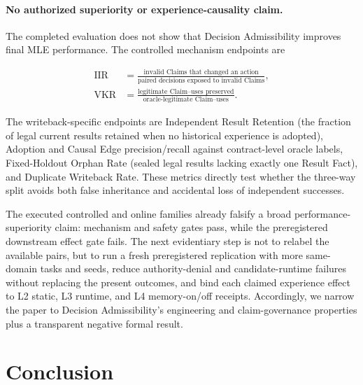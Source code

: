 \documentclass{article}
\begin{document}
\paragraph{No authorized superiority or experience-causality claim.}
The completed evaluation does not show that Decision Admissibility improves
final MLE performance.  The controlled mechanism endpoints are

\begin{equation*}
\begin{aligned}
\mathrm{IIR}&=\frac{\text{invalid Claims that changed an action}}
{\text{paired decisions exposed to invalid Claims}},\\
\mathrm{VKR}&=\frac{\text{legitimate Claim--uses preserved}}
{\text{oracle-legitimate Claim--uses}}.
\end{aligned}
\end{equation*}

The writeback-specific endpoints are Independent Result Retention (the fraction
of legal current results retained when no historical experience is adopted),
Adoption and Causal Edge precision/recall against contract-level oracle labels,
Fixed-Holdout Orphan Rate (sealed legal results lacking exactly one Result
Fact), and Duplicate Writeback Rate.  These metrics directly test whether the
three-way split avoids both false inheritance and accidental loss of independent
successes.

The executed controlled and online families already falsify a broad
performance-superiority claim: mechanism and safety gates pass, while the
preregistered downstream effect gate fails.  The next evidentiary step is not to
relabel the available pairs, but to run a fresh preregistered replication with
more same-domain tasks and seeds, reduce authority-denial and candidate-runtime
failures without replacing the present outcomes, and bind each claimed
experience effect to L2 static, L3 runtime, and L4 memory-on/off receipts.
Accordingly, we narrow the paper to Decision Admissibility's engineering and
claim-governance properties plus a transparent negative formal result.

\section{Conclusion}
\end{document}
